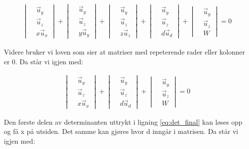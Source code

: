 \begin{align} \label{eq:det_divided}
	\begin{vmatrix}
	&\vec{u}_y\\
	&\vec{u}_z \\
	&x\vec{u}_x
	\end{vmatrix}
	+
	\begin{vmatrix}
	&\vec{u}_y\\
	&\vec{u}_z \\
	&y\vec{u}_y
	\end{vmatrix}
	+
	\begin{vmatrix}
	&\vec{u}_y\\
	&\vec{u}_z \\
	&z\vec{u}_z
	\end{vmatrix}
	+
	\begin{vmatrix}
	&\vec{u}_y\\
	&\vec{u}_z \\
	&d\vec{u}_d
	\end{vmatrix}
	+
	\begin{vmatrix}
	&\vec{u}_y\\
	&\vec{u}_z \\
	&W
	\end{vmatrix}
	=0
\end{align}

Videre bruker vi loven som sier at matriser med repeterende rader eller kolonner er 0. Da står vi igjen med: 

\begin{align} \label{eq:det_final}
	\begin{vmatrix}
	&\vec{u}_y\\
	&\vec{u}_z \\
	&x\vec{u}_x
	\end{vmatrix}
	+
	\begin{vmatrix}
	&\vec{u}_y\\
	&\vec{u}_z \\
	&d\vec{u}_d
	\end{vmatrix}
	+
	\begin{vmatrix}
	&\vec{u}_y\\
	&\vec{u}_z \\
	&W
	\end{vmatrix}
	=0
\end{align}

Den første delen av determinanten uttrykt i ligning \ref{eq:det_final} kan løses opp og få x på utsiden. Det samme kan gjøres hvor d inngår i matrisen. Da står vi igjen med: 

